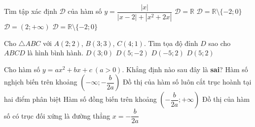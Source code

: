 \begin{ex}%
	Tìm tập xác định $ \mathscr{D} $ của hàm số $ y = \dfrac{\left|x\right|}{\left|x - 2\right| + \left|x^2 + 2x\right|} $	
	\choice
	{\True $ \mathscr{D} = \mathbb{R} $}
	{$ \mathscr{D} = \mathbb{R} \setminus \lbrace-2 ; 0 \rbrace $}
	{$ \mathscr{D} = \left(2;+\infty\right) $}
	{$ \mathscr{D} = \mathbb{R} \setminus \lbrace-2 ; 0 \rbrace $}
\end{ex}

\begin{ex}%
	Cho $ \triangle ABC $ với $ A\left(2;2\right) $, $ B\left(3;3\right) $, $ C\left(4;1\right) $. Tìm tọa độ đỉnh $ D $ sao cho $ ABCD $ là hình bình hành.
	\choice
	{\True $ D\left(3;0\right) $}
	{$ D\left(5;-2\right) $}
	{$ D\left(-5;2\right) $}
	{$ D\left(5;2\right) $}
\end{ex}

\begin{ex}%
	Cho hàm số $ y = ax^2 + bx + c \ \left(a > 0\right) $. Khẳng định nào sau đây là \textbf{sai}?
	\choice
	{Hàm số nghịch biến trên khoảng $ \left(-\infty;-\dfrac{b}{2a}\right) $}
	{\True Đồ thị của hàm số luôn cắt trục hoành tại hai điểm phân biệt}
	{Hàm số đồng biến trên khoảng $ \left(-\dfrac{b}{2a};+\infty\right) $}
	{Đồ thị của hàm số có trục đối xứng là đường thẳng $ x = -\dfrac{b}{2a} $}
\end{ex}

